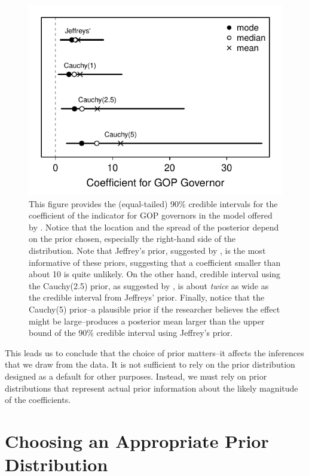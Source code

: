 \documentclass[12pt]{article}
\begin{document}
\begin{figure}[H]
\begin{center}
\includegraphics[scale = .8]{figs/matters-ci.pdf}
\caption{This figure provides the (equal-tailed) 90\% credible intervals for the coefficient of the indicator for GOP governors in the model offered by \cite{BarrilleauxRainey2014}. Notice that the location and the spread of the posterior depend on the prior chosen, especially the right-hand side of the distribution. Note that Jeffrey's prior, suggested by \cite{Zorn2005}, is the most informative of these priors, suggesting that a coefficient smaller than about 10 is quite unlikely. On the other hand, credible interval using the Cauchy(2.5) prior, as suggested by \cite{Gelmanetal2008}, is about \emph{twice} as wide as the credible interval from Jeffreys' prior. Finally, notice that the Cauchy(5) prior--a plausible prior if the researcher believes the effect might be large--produces a posterior mean larger than the upper bound of the 90\% credible interval using Jeffrey's prior.}\label{fig:matters-ci}
\end{center}
\end{figure}

This leads us to conclude that the choice of prior matters--it affects the inferences that we draw from the data. It is not sufficient to rely on the prior distribution designed as a default for other purposes. Instead, we must rely on prior distributions that represent actual prior information about the likely magnitude of the coefficients.


\section*{Choosing an Appropriate Prior Distribution}
\end{document}
